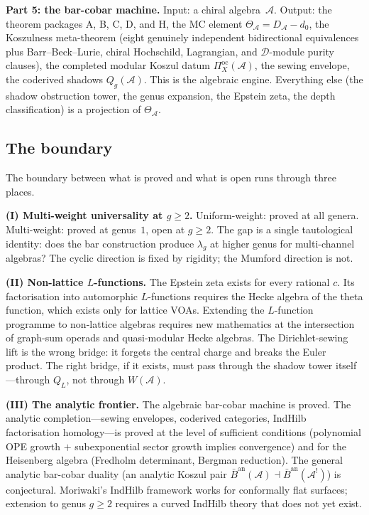\documentclass[11pt]{article}
\newcommand{\cA}{\mathcal{A}}
\newcommand{\B}{\bar{B}}
\begin{document}
\medskip

\noindent\textbf{Part 5: the bar-cobar machine.}\enspace
Input: a chiral algebra~$\cA$.
Output: the theorem packages A, B, C, D, and H, the MC element
$\Theta_\cA = D_\cA - d_0$,
the Koszulness meta-theorem (eight genuinely independent
bidirectional equivalences plus Barr--Beck--Lurie, chiral
Hochschild, Lagrangian, and $\mathcal{D}$-module purity
clauses), the completed modular Koszul datum
$\Pi^{\mathrm{oc}}_X(\cA)$, the sewing envelope, the
coderived shadows $Q_g(\cA)$.  This is the algebraic engine.
Everything else (the shadow obstruction tower, the genus expansion, the
Epstein zeta, the depth classification) is a projection of
$\Theta_\cA$.

\subsection{The boundary}

The boundary between what is proved and what is open runs
through three places.

\medskip

\noindent\textbf{(I) Multi-weight universality at $g \geq 2$.}\enspace
Uniform-weight: proved at all genera.  Multi-weight: proved at
genus~$1$, open at $g \geq 2$.  The gap is a single
tautological identity: does the bar construction produce
$\lambda_g$ at higher genus for multi-channel algebras?  The
cyclic direction is fixed by rigidity; the Mumford direction is
not.

\medskip

\noindent\textbf{(II) Non-lattice $L$-functions.}\enspace
The Epstein zeta exists for every rational $c$.  Its
factorisation into automorphic $L$-functions requires the
Hecke algebra of the theta function, which exists only for
lattice VOAs.  Extending the $L$-function programme to
non-lattice algebras requires new mathematics at the
intersection of graph-sum operads and quasi-modular Hecke
algebras.  The Dirichlet-sewing lift is the wrong bridge:
it forgets the central charge and breaks the Euler product.
The right bridge, if it exists, must pass through the shadow
tower itself---through $Q_L$, not through $W(\cA)$.

\medskip

\noindent\textbf{(III) The analytic frontier.}\enspace
The algebraic bar-cobar machine is proved.  The analytic
completion---sewing envelopes, coderived categories, IndHilb
factorisation homology---is proved at the level of sufficient
conditions (polynomial OPE growth $+$ subexponential sector
growth implies convergence) and for the Heisenberg algebra
(Fredholm determinant, Bergman reduction).  The general analytic
bar-cobar duality (an analytic Koszul pair
$\B^{\mathrm{an}}(\cA) \dashv \B^{\mathrm{an}}(\cA^!)$) is
conjectural.  Moriwaki's IndHilb framework works for
conformally flat surfaces; extension to genus $g \geq 2$
requires a curved IndHilb theory that does not yet exist.
\end{document}

